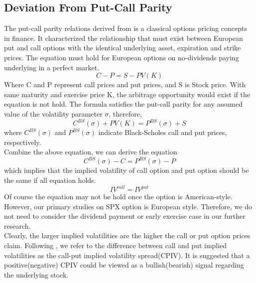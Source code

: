
\subsection{Deviation From Put-Call Parity}
The put-call parity relations derived from \cite{stoll1969relationship} is a classical options pricing concepts in finance. It characterized the relationship that must exist between European put and call options with the identical underlying asset, expiration and strike prices. The equation must hold for European options on no-dividends paying underlying in a perfect market. 
\begin{equation}
C-P = S - PV(K)
\end{equation}
Where C and P represent call prices and put prices, and S is Stock price. With same maturity and exercise price K, the arbitrage opportunity would exist if the equation is not hold. The \cite{black1973pricing} formula satisfies the put-call parity for any assumed value of the volatility parameter $\sigma$, therefore, 
\begin{equation}
C^{BS}(\sigma ) + PV(K) = P^{BS}(\sigma ) + S
\end{equation}
where $C^{BS}(\sigma )$ and $P^{BS}(\sigma )$ indicate Black-Scholes call and put prices, respectively. 
\\
Combine the above equation, we can derive the equation
\begin{equation}
C^{BS}(\sigma ) - C = P^{BS}(\sigma ) - P
\end{equation}
which implies that the implied volatility of call option and put option should be the same if all equation holds. 
\begin{equation}
IV^{call} = IV^{put}
\end{equation}
Of course the equation may not be hold once the option is American-style. However, our primary studies on SPX option is European style. Therefore, we do not need to consider the dividend payment or early exercise case in our further research. 
\\

Clearly, the larger implied volatilities are the higher the call or put option prices claim. Following \cite{amin2004index}, we refer to the difference between call and put implied volatilities as the call-put implied volatility spread(CPIV). It is suggested that a positive(negative) CPIV could be viewed as a bullish(bearish) signal regarding the underlying stock. 
\\ 


